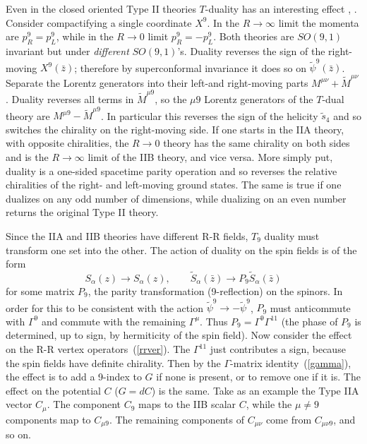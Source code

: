 \documentclass[12pt]{article}
\def\be{\begin{equation}}
\def\ee{\end{equation}}
\newcommand{\zb}{{\bar{z}}}
\begin{document}
Even in the closed oriented Type II theories $T$-duality has an
interesting effect \cite{dhs}, \cite{dlp}.  Consider
compactifying a single coordinate $X^9$.  In the $R\to \infty$ limit the
momenta are $p^9_R = p^9_L$, while in the $R \to 0$ limit $p^9_R = -p^9_L$. 
Both theories are
$SO(9,1)$ invariant but under {\it different} $SO(9,1)$'s.
Duality reverses the sign of the right-moving $X^9(\zb)$; therefore by
superconformal invariance it does so on $\tilde\psi^9(\zb)$.  Separate the
Lorentz generators into their left-and right-moving parts $M^{\mu\nu} +
\tilde M^{\mu\nu}$. Duality reverses all terms in $\tilde M^{\mu 9}$, so the
$\mu 9$ Lorentz generators of the $T$-dual theory are $M^{\mu 9} - \tilde
M^{\mu 9}$. In particular this reverses the sign of the helicity $\tilde
s_4$ and so switches the chirality on the right-moving side.  If one starts
in the IIA theory, with opposite chiralities, the $R\to 0$ theory has the
same chirality on both sides and is the $R\to\infty$ limit of the IIB theory,
and vice versa.  More simply put, duality is a one-sided spacetime parity
operation and so reverses the relative chiralities of the right- and
left-moving ground states.  The same is true if one dualizes on any odd
number of dimensions, while dualizing on an even number returns the original
Type II theory.

Since the IIA and IIB theories have different R-R fields, $T_9$ duality
must transform one set into the other.  The action of duality on the spin
fields is of the form
\be
S_{\alpha} (z) \to S_{\alpha} (z),\qquad
\tilde{S}_{\alpha} (\bar{z}) \to P_9 \tilde{S}_{\alpha} (\bar{z}) 
\ee
for some matrix $P_9$, the parity transformation (9-reflection) on the
spinors.  In order for this to be consistent with the action $\tilde\psi^9 \to
-\tilde\psi^9$,
$P_9$ must anticommute with
$\Gamma^9$ and commute with the remaining $\Gamma^\mu$.  Thus
$P_9 =
\Gamma^9\Gamma^{11}$ (the phase of $P_9$ is determined, up to sign, by
hermiticity of the spin field).  Now consider the effect on the R-R vertex
operators~(\ref{rrver}).  The $\Gamma^{11}$ just contributes a sign, because
the spin fields have definite chirality.  Then by the $\Gamma$-matrix
identity~(\ref{gamma}), the effect is to add a 9-index to $G$ if none is
present, or to remove one if it is.  The effect on the potential $C$ ($G =
dC$) is the same.  Take as an example the Type IIA vector $C_\mu$.
The component $C_9$ maps to the IIB scalar $C$, while the $\mu\neq 9$
components map to $C_{\mu 9}$.  The remaining components of $C_{\mu\nu}$
come from $C_{\mu \nu 9}$, and so on.
\end{document}
